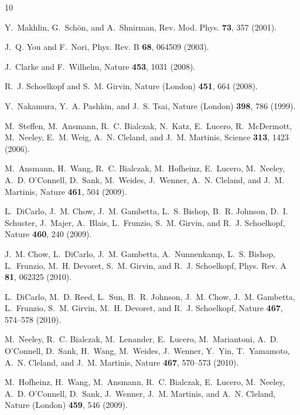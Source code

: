 \documentclass[pra,twocolumn,floatfix,superscriptaddress,eqsecnum]{revtex4-1}
\begin{document}
%
%
\begin{thebibliography}{10}

Y.~Makhlin, G.~Sch{\"o}n, and A.~Shnirman, Rev. Mod. Phys. \textbf{73}, 357
  (2001).

J.~Q. You and F.~Nori, Phys. Rev. B \textbf{68}, 064509 (2003).

J.~Clarke and F.~Wilhelm, Nature \textbf{453}, 1031 (2008).

R.~J. Schoelkopf and S.~M. Girvin, Nature (London) \textbf{451}, 664 (2008).

Y.~Nakamura, Y.~A. Pashkin, and J.~S. Tsai, Nature (London) \textbf{398}, 786
  (1999).

M.~Steffen, M.~Ansmann, R.~C. Bialczak, N.~Katz, E.~Lucero, R.~McDermott,
  M.~Neeley, E.~M. Weig, A.~N. Cleland, and J.~M. Martinis, Science
  \textbf{313}, 1423 (2006).

M.~Ansmann, H.~Wang, R.~C. Bialczak, M.~Hofheinz, E.~Lucero, M.~Neeley, A.~D.
  O'Connell, D.~Sank, M.~Weides, J.~Wenner, A.~N. Cleland, and J.~M. Martinis,
  Nature \textbf{461}, 504 (2009).

L.~DiCarlo, J.~M. Chow, J.~M. Gambetta, L.~S. Bishop, B.~R. Johnson, D.~I.
  Schuster, J.~Majer, A.~Blais, L.~Frunzio, S.~M. Girvin, and R.~J. Schoelkopf,
  Nature \textbf{460}, 240 (2009).

J.~M. Chow, L.~DiCarlo, J.~M. Gambetta, A.~Nunnenkamp, L.~S. Bishop,
  L.~Frunzio, M.~H. Devoret, S.~M. Girvin, and R.~J. Schoelkopf, Phys. Rev. A
  \textbf{81}, 062325 (2010).

L.~DiCarlo, M.~D. Reed, L.~Sun, B.~R. Johnson, J.~M. Chow, J.~M. Gambetta,
  L.~Frunzio, S.~M. Girvin, M.~H. Devoret, and R.~J. Schoelkopf,
  Nature \textbf{467}, 574–578 (2010).

M.~Neeley, R.~C. Bialczak, M.~Lenander, E.~Lucero, M.~Mariantoni, A.~D.
  O'Connell, D.~Sank, H.~Wang, M.~Weides, J.~Wenner, Y.~Yin, T.~Yamamoto, A.~N.
  Cleland, and J.~M. Martinis, Nature \textbf{467}, 570–573 (2010).

M.~Hofheinz, H.~Wang, M.~Ansmann, R.~C. Bialczak, E.~Lucero, M.~Neeley, A.~D.
  O'Connell, D.~Sank, J.~Wenner, J.~M. Martinis, and A.~N. Cleland, Nature
  (London) \textbf{459}, 546 (2009).


\end{thebibliography}
\end{document}
